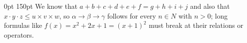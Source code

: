 \documentclass{article}
\begin{document}
 0pt 150pt We know that $a+b+c+d+e+f=g+h+i+j$ and also that
$x\cdot y\cdot z\leq u\times v\times w$, so $\alpha\to\beta\to\gamma$
follows for every $n\in N$ with $n>0$; long formulas like
$f(x)=x^2+2x+1=(x+1)^2$ must break at their relations or operators.
\end{document}
